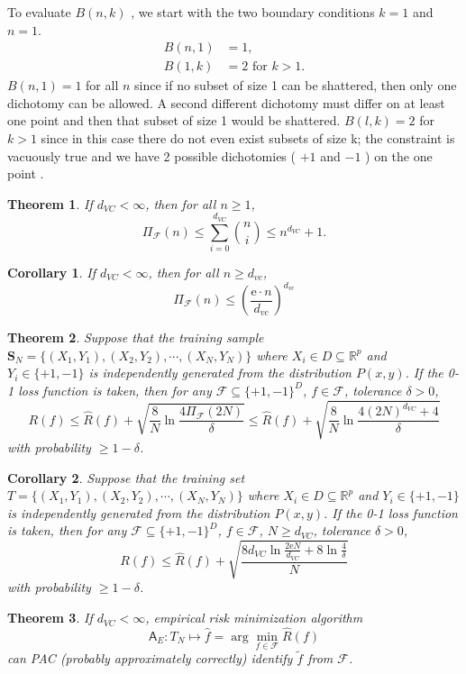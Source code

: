 \documentclass{report}
\newtheorem{corollary}{Corollary}[chapter]
\newtheorem{theorem}{Theorem}[chapter]
\theoremstyle{nonumberplain}
\newcommand{\0}{\mathbf{0}}
\begin{document}
To evaluate $B(n, k)$ , we start with the two boundary conditions
$k = 1$ and $n = 1$.
\[
\begin{aligned} B(n, 1) &=1, \\
 B(1,k) &=2 \text { for } k>1. \end{aligned}
\]
$B(n,1) = 1$ for all $n$ since if no subset of size 1 can be shattered, then only one dichotomy can be allowed. A second different dichotomy must differ on at least one point and then that subset of size 1 would be shattered. $B(l,k) = 2$ for $k > 1$ since in this case there do not even exist subsets of size k; the constraint is vacuously true and we have 2 possible dichotomies ( $+1$ and $-1$ ) on the one point .
\begin{theorem}
	If $d_{VC}<\infty$, then for all $n\ge1$,
	\[
	\Pi_{\mathcal{F}}(n) \le \sum_{i=0}^{d_{VC}}\binom{n}{i}\le n^{d_{VC}}+1.
	\]
\end{theorem}

\begin{corollary}
	If $d_{VC}<\infty$, then for all $n\ge d_{vc}$,
	\[
	\Pi_{\mathcal{F}}(n) \le\left(\frac{\mathrm{e}\cdot n }{d_{vc}}\right)^{d_{vc}}
	\]
\end{corollary}
\begin{theorem}
Suppose that the training sample $\mathbf{S}_N=\{(X_1,Y_1),(X_2,Y_2),\cdots,(X_{N},Y_{N})\}$ where $X_i\in D\subseteq\mathbb{R}^p$ and $Y_i\in\{+1,-1\}$ is  independently generated from the distribution $P(x,y)$. If the 0-1 loss function is taken, then for any $\mathcal{F}\subseteq\{+1,-1\}^D$, $f\in\mathcal{F}$, tolerance $\delta > 0$,
\[
R(f) \le \widehat{R}(f)+\sqrt{\frac{8}{N} \ln \frac{4 \Pi_{\mathcal{F}}(2N)}{\delta}}\le\widehat{R}(f) +\sqrt{\frac{8}{N} \ln \frac{4 (2N)^{d_{VC}}+4}{\delta}}
\]
with probability $\ge 1-\delta$.
\end{theorem}
\begin{corollary}
	Suppose that the training set $T=\{(X_1,Y_1),(X_2,Y_2),\cdots,(X_{N},Y_{N})\}$ where $X_i\in D\subseteq\mathbb{R}^p$ and $Y_i\in\{+1,-1\}$ is  independently generated from the distribution $P(x,y)$. If the 0-1 loss function is taken, then for any $\mathcal{F}\subseteq\{+1,-1\}^D$, $f\in\mathcal{F}$, $N\ge d_{VC}$, tolerance $\delta > 0$,
	\[
	R(f) \le \widehat{R}(f)+\sqrt{\frac{8 d_{VC} \ln \frac{2 \mathrm{e} N}{d_{VC}}+8 \ln \frac{4}{\delta}}{N}}
	\]
	with probability $\ge 1-\delta$.
\end{corollary}

\begin{theorem}
	If $d_{VC}<\infty$, empirical risk minimization algorithm 
	$$\mathsf{A}_E:T_N\longmapsto \hat{f}=\arg\min_{f\in\mathcal{F}}\widehat{R}(f) $$
	can PAC (probably approximately correctly) identify $\tilde{f}$ from $\mathcal{F}$.
\end{theorem}
\end{document}
